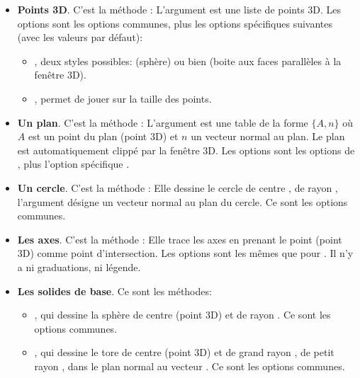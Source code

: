 \begin{itemize}
    \item \textbf{Points 3D}. C'est la méthode : 
    L'argument  est une liste de points 3D. Les options sont les options communes, plus les options spécifiques suivantes (avec les valeurs par défaut): 
        \begin{itemize}
        \item {}, deux styles possibles:  (sphère) ou bien  (boite aux faces parallèles à la fenêtre 3D).
        \item {}, permet de jouer sur la taille des points.
    \end{itemize} 
    
    \item \textbf{Un plan}. C'est la méthode : 
    L'argument  est une table de la forme $\{A,n\}$ où $A$ est un point du plan  (point 3D) et $n$ un vecteur normal au plan. Le plan est automatiquement clippé par la fenêtre 3D. Les options sont les options de , plus l'option spécifique .
    
    \item \textbf{Un cercle}. C'est la méthode : 
    Elle dessine le cercle de centre , de rayon , l'argument  désigne un vecteur normal au plan du cercle. Ce sont les options communes.
    
     \item \textbf{Les axes}. C'est la méthode : 
    Elle trace les axes en prenant le point  (point 3D) comme point d'intersection. Les options sont les mêmes que pour . Il n'y a ni graduations, ni légende.
    
    \item \textbf{Les solides de base}. Ce sont les méthodes:
        \begin{itemize}
            \item {}, qui dessine la sphère de centre   (point 3D) et de rayon . Ce sont les options communes.

            \item {}, qui dessine le tore de centre  (point 3D) et de grand rayon , de petit rayon , dans le plan normal au vecteur . Ce sont les options communes.
            

\end{itemize}
\end{itemize}
